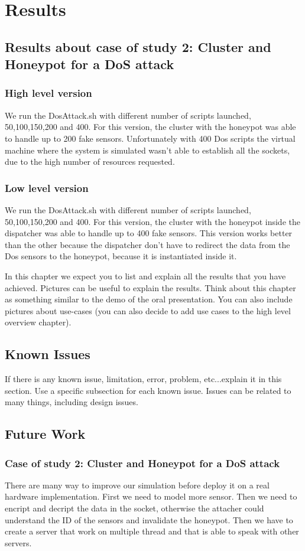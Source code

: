 \chapter{Results}
\section{Results about case of study 2: Cluster and Honeypot for a DoS attack}

\subsection{High level version}
We run the DosAttack.sh with different number of scripts launched, 50,100,150,200 and 400. For this version, the cluster with the honeypot was able to handle up to 200 fake sensors. 
Unfortunately with 400 Dos scripts the virtual machine where the system is simulated wasn't able to establish all the sockets, due to the high number of resources requested.

\subsection{Low level version} 
We run the DosAttack.sh with different number of scripts launched, 50,100,150,200 and 400. For this version, the cluster with the honeypot inside the dispatcher was able to handle
 up to 400 fake sensors. 
This version works better than the other because the dispatcher don't have to redirect the data from the Dos sensors to the honeypot, because it is instantiated inside it.

In this chapter we expect you to list and explain all the results that you have achieved. Pictures can be useful to explain the results. Think about this chapter as something similar to the demo of the oral presentation. You can also include pictures about use-cases (you can also decide to add use cases to the high level overview chapter).
\section{Known Issues}
If there is any known issue, limitation, error, problem, etc...explain it in this section. Use a specific subsection for each known issue. Issues can be related to many things, including design issues.
\section{Future Work}
\subsection{Case of study 2: Cluster and Honeypot for a DoS attack}
There are many way to improve our simulation before deploy it on a real hardware implementation. First we need to model more sensor. Then we need to encript and decript the data in the socket, otherwise the attacher could understand the ID of the sensors and invalidate the honeypot. Then we have to create a server that work on multiple thread and that is able to speak with other servers. 